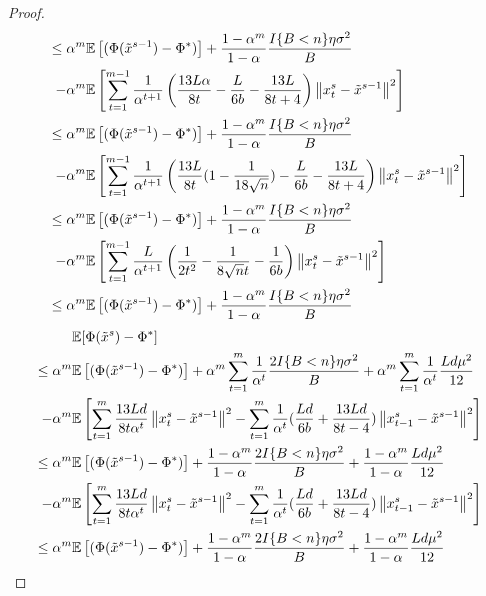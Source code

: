 \documentclass{article}
\newcommand*{\E}{\mathbb{E}}
\newcommand{\norm}[1]{\left\lVert#1\right\rVert}
\theoremstyle{definition}
\theoremstyle{remark}
\begin{document}
\begin{proof}
\begin{align}
\leq\alpha^m\E&\left[(\Phi(\tilde{x}^{s-1}) - \Phi^*)\right] + \frac{1-\alpha^m}{1-\alpha}\frac{I\{B < n\}\eta \sigma ^2}{B}\notag
\\-\alpha^m\E&\left[\sum_{t=1}^{m-1}\frac{1}{\alpha^{t+1}}\left(\frac{13L\alpha}{8t}-\frac{L}{6b} - \frac{13L}{8t+4}\right) \norm{x_{t}^s-\tilde{x}^{s-1}}^2 \right]\notag\\
\leq\alpha^m\E&\left[(\Phi(\tilde{x}^{s-1}) - \Phi^*)\right] + \frac{1-\alpha^m}{1-\alpha}\frac{I\{B < n\}\eta \sigma ^2}{B}\notag
\\-\alpha^m\E&\left[\sum_{t=1}^{m-1}\frac{1}{\alpha^{t+1}}\left(\frac{13L}{8t}(1-\frac{1}{18\sqrt{n}})-\frac{L}{6b} - \frac{13L}{8t+4}\right) \norm{x_{t}^s-\tilde{x}^{s-1}}^2 \right]\label{eq49}\\
\leq\alpha^m\E&\left[(\Phi(\tilde{x}^{s-1}) - \Phi^*)\right] + \frac{1-\alpha^m}{1-\alpha}\frac{I\{B < n\}\eta \sigma ^2}{B}\notag
\\-\alpha^m\E&\left[\sum_{t=1}^{m-1}\frac{L}{\alpha^{t+1}}\left(\frac{1}{2t^2}-\frac{1}{8\sqrt{n}t}-\frac{1}{6b} \right) \norm{x_{t}^s-\tilde{x}^{s-1}}^2 \right]\notag\\
\leq\alpha^m\E&\left[(\Phi(\tilde{x}^{s-1}) - \Phi^*)\right] + \frac{1-\alpha^m}{1-\alpha}\frac{I\{B < n\}\eta \sigma ^2}{B}\label{eq50}
\end{align}
{\color{blue}
\begin{align}
\E&[\Phi(\tilde{x}^s)-\Phi^*]\notag\\
\leq\alpha^m\E&\left[(\Phi(\tilde{x}^{s-1}) - \Phi^*)\right] +\alpha^m\sum_{t=1}^m \frac{1}{\alpha^t}\frac{2I\{B < n\}\eta \sigma ^2}{B}+\alpha^m\sum_{t=1}^m \frac{1}{\alpha^t}\frac{L d \mu^2}{12}\notag
\\-\alpha^m\E&\left[\sum_{t=1}^m\frac{13Ld}{8t\alpha^t}\norm{{x}_t^s-\tilde{x}^{s-1}}^2-\sum_{t=1}^m\frac{1}{\alpha^t}(\frac{Ld}{6b}+\frac{13Ld}{8t-4}) \norm{x_{t-1}^s-\tilde{x}^{s-1}}^2 \right]\notag\\
\leq\alpha^m\E&\left[(\Phi(\tilde{x}^{s-1}) - \Phi^*)\right] + \frac{1-\alpha^m}{1-\alpha}\frac{2I\{B < n\}\eta \sigma ^2}{B}+\frac{1-\alpha^m}{1-\alpha}\frac{L d \mu^2}{12}\notag
\\-\alpha^m\E&\left[\sum_{t=1}^m\frac{13Ld}{8t\alpha^t}\norm{{x}_t^s-\tilde{x}^{s-1}}^2-\sum_{t=1}^m\frac{1}{\alpha^t}(\frac{Ld}{6b}+\frac{13Ld}{8t-4}) \norm{x_{t-1}^s-\tilde{x}^{s-1}}^2 \right]\notag\\
\leq\alpha^m\E&\left[(\Phi(\tilde{x}^{s-1}) - \Phi^*)\right] + \frac{1-\alpha^m}{1-\alpha}\frac{2I\{B < n\}\eta \sigma ^2}{B}+\frac{1-\alpha^m}{1-\alpha}\frac{L d \mu^2}{12}\notag

\end{align}}
\end{proof}
\end{document}
